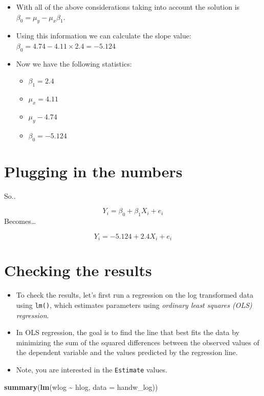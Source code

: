 \documentclass[
]{article}
\newenvironment{Shaded}{\begin{snugshade}}{\end{snugshade}}
\newcommand{\AttributeTok}[1]{\textcolor[rgb]{0.13,0.29,0.53}{#1}}
\newcommand{\FunctionTok}[1]{\textcolor[rgb]{0.13,0.29,0.53}{\textbf{#1}}}
\newcommand{\NormalTok}[1]{#1}
\newcommand{\SpecialCharTok}[1]{\textcolor[rgb]{0.81,0.36,0.00}{\textbf{#1}}}
\providecommand{\tightlist}{%
  \setlength{\itemsep}{0pt}\setlength{\parskip}{0pt}}
\begin{document}
\begin{itemize}
\item
  With all of the above considerations taking into account the solution
  is \(\beta_0 = \mu_y - \mu_x\beta_1\).
\item
  Using this information we can calculate the slope value:
  \(\beta_0 = 4.74 - 4.11 \times 2.4 = -5.124\)
\item
  Now we have the following statistics:

  \begin{itemize}
  \item
    \(\beta_1 = 2.4\)
  \item
    \(\mu_x = 4.11\)
  \item
    \(\mu_y - 4.74\)
  \item
    \(\beta_0 = -5.124\)
  \end{itemize}
\end{itemize}

\hypertarget{plugging-in-the-numbers-1}{%
\section{Plugging in the numbers}\label{plugging-in-the-numbers-1}}

So..

\[Y_i = \beta_0 + \beta_1 X_i + e_i\] Becomes\ldots{}

\[Y_i = -5.124 + 2.4X_i + e_i\]

\hypertarget{checking-the-results}{%
\section{Checking the results}\label{checking-the-results}}

\begin{itemize}
\tightlist
\item
  To check the results, let's first run a regression on the log
  transformed data using \texttt{lm()}, which estimates parameters using
  \emph{ordinary least squares (OLS) regression}.
\item
  In OLS regression, the goal is to find the line that best fits the
  data by minimizing the sum of the squared differences between the
  observed values of the dependent variable and the values predicted by
  the regression line.
\item
  Note, you are interested in the \texttt{Estimate} values.
\end{itemize}

\begin{Shaded}
\begin{Highlighting}[]
\FunctionTok{summary}\NormalTok{(}\FunctionTok{lm}\NormalTok{(wlog }\SpecialCharTok{\textasciitilde{}}\NormalTok{ hlog,}
           \AttributeTok{data =}\NormalTok{ handw\_log))}
\end{Highlighting}
\end{Shaded}
\end{document}
